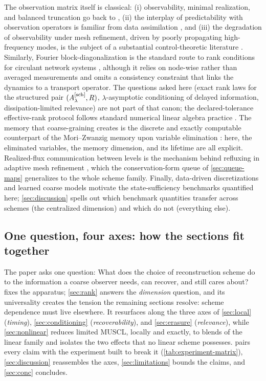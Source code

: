 \documentclass[pdflatex,sn-mathphys-num]{sn-jnl}%
\theoremstyle{thmstyleone}%
\theoremstyle{thmstyletwo}%
\theoremstyle{thmstylethree}%
\newcommand{\Asch}{A^{[\rm sch]}_\lambda}
\begin{document}
The observation matrix itself is classical: (i) observability, minimal realization, and balanced truncation go back to \cite{HoKalman1966,Moore1981}, (ii) the interplay of predictability with observation operators is familiar from data assimilation \cite{CohnDee1988}, and (iii) the degradation of observability under mesh refinement, driven by poorly propagating high-frequency modes, is the subject of a substantial control-theoretic literature \cite{Zuazua2005}.
Similarly, Fourier block-diagonalization is the standard route to rank conditions for circulant network systems \cite{ParlangeliNotarstefano2012,NabiMesbahi2013}, although it relies on node-wise rather than averaged measurements and omits a consistency constraint that links the dynamics to a transport operator.
The questions asked here (exact rank laws for the structured pair $(\Asch,R)$, $\lambda$-asymptotic conditioning of delayed information, dissipation-limited relevance) are not part of that canon; the declared-tolerance effective-rank protocol follows standard numerical linear algebra practice \cite{TrefethenBau1997,Higham2002}.
The memory that coarse-graining creates is the discrete and exactly computable counterpart of the Mori--Zwanzig memory upon variable elimination \cite{Mori1965,Zwanzig1961,ChorinHaldKupferman2002}: here, the eliminated variables, the memory dimension, and its lifetime are all explicit.
Realized-flux communication between levels is the mechanism behind refluxing in adaptive mesh refinement \cite{BergerColella1989}, which the conservation-form queue of \cref{sec:queue-maps} generalizes to the whole scheme family.
Finally, data-driven discretizations and learned coarse models \cite{BarSinai2019,KochkovEtAl2021} motivate the state-sufficiency benchmarks quantified here; \cref{sec:discussion} spells out which benchmark quantities transfer across schemes (the centralized dimension) and which do not (everything else).

\subsection{One question, four axes: how the sections fit together}
\label{sec:organization}

The paper asks one question: What does the choice of reconstruction scheme do to the information a coarse observer needs, can recover, and still cares about?
 fixes the apparatus; \cref{sec:rank} answers the \emph{dimension} question, and its universality creates the tension the remaining sections resolve: scheme dependence must live elsewhere.
It resurfaces along the three axes of \cref{sec:local} (\emph{timing}), \cref{sec:conditioning} (\emph{recoverability}), and \cref{sec:erasure} (\emph{relevance}), while \cref{sec:nonlinear} reduces limited MUSCL, locally and exactly, to blends of the linear family and isolates the two effects that no linear scheme possesses.
 pairs every claim with the experiment built to break it (\cref{tab:experiment-matrix}), \cref{sec:discussion} reassembles the axes, \cref{sec:limitations} bounds the claims, and \cref{sec:conc} concludes.
\end{document}
